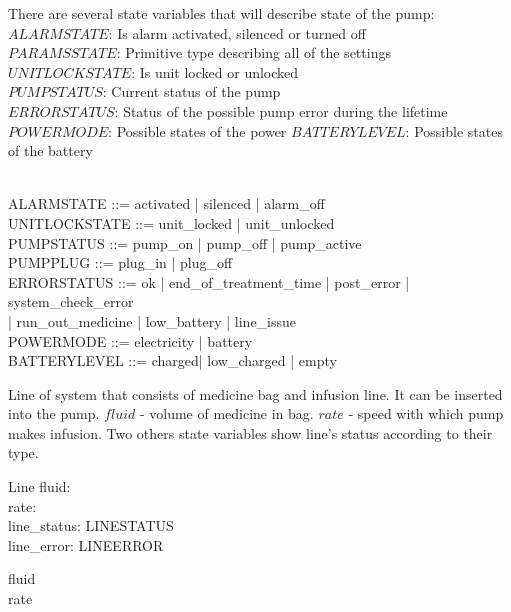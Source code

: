 \documentclass{article}
\begin{document}
	
	There are several state variables that will describe state of the pump:\\
	
	
	$ALARMSTATE$: Is alarm activated, silenced or turned off\\
	$PARAMSSTATE$: Primitive type describing all of the settings\\
	$UNITLOCKSTATE$: Is unit locked or unlocked \\

	$PUMPSTATUS$: Current status of the pump\\
	$ERRORSTATUS$: Status of the possible pump error during the lifetime\\
	$POWERMODE$: Possible states of the power
	$BATTERYLEVEL$: Possible states of the battery 
	
	\begin{zed}	
		[PARAMSSTATE] \\ %
		
		ALARMSTATE ::= activated | silenced | alarm\_off \\
		
	
		UNITLOCKSTATE ::= unit\_locked | unit\_unlocked \\
	
		PUMPSTATUS ::= pump\_on | pump\_off | pump\_active \\
		
		PUMPPLUG ::=  plug\_in | plug\_off\\
		
		ERRORSTATUS ::= ok | end\_of\_treatment\_time | post\_error | system\_check\_error \\ | run\_out\_medicine | low\_battery | line\_issue \\
		
		
		POWERMODE ::= electricity | battery  \\
		
		BATTERYLEVEL ::= charged| low\_charged | empty\\
	
	\end{zed}
	
	
	Line of system that consists of medicine bag and infusion line. It can be inserted into the pump. $fluid$ - volume of medicine in bag. $rate$ - speed with which pump makes infusion. Two others state variables show line's status according to their type.
	
	\begin{schema}{Line}
		fluid: \nat \\
		rate: \nat \\
		line\_status: LINESTATUS \\
		line\_error: LINEERROR
	\where

	
		fluid  \\ 
		rate 
	\end{schema}
	
\end{document}
